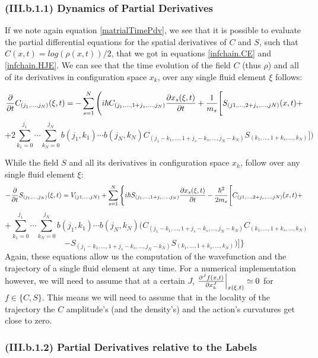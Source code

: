 \documentclass[11pt, a4paper]{article} %
\begin{document}
\subsubsection*{(III.b.1.1) Dynamics of Partial Derivatives}

If we note again equation \eqref{matrialTimePdv}, we see that it is possible to evaluate the partial differential equations for the spatial derivatives of $C$ and $S$, such that $C(x,t)=log(\rho(x,t))/2$, that we got in equations \eqref{infchain.CE} and \eqref{infchain.HJE}. We can see that the time evolution of the field $C$ (thus $\rho$) and all of its derivatives in configuration space $x_k$, over any single fluid element $\xi$ follows:

\begin{equation}\label{infchain.CE.L}
\pdv{}{t}C_{(j_1,...,j_N)}(\xi,t)=-\sum_{s=1}^N \Bigg(i\hbar C_{(j_1,...,1+j_s,...,j_N)}\pdv{x_s(\xi,t)}{t} + \frac{1}{m_s} \Bigg[S_{(j1,...,2+j_s,...,jN)}(x,t)+
\end{equation}
$$
+2 \sum_{k_1=0}^{j_1}\cdots\sum_{k_N=0}^{j_N} b(j_1,k_1)\cdots b(j_N,k_N)C_{(j_1-k_1,...,1+j_s-k_s,...,j_N-k_N)}S_{(k_1,...,1+k_s,...,k_N)} \Bigg]\bigg)
$$

While the field $S$ and all its derivatives in configuration space $x_k$, follow over any single fluid element $\xi$:
\begin{equation}\label{infchain.HJE.L}
-\pdv{}{t}S_{(j_1,...,j_N)}(\xi,t)=V_{(j1,...,jN)}+\sum_{s=1}^N\Bigg\{ i\hbar S_{(j_1,...,1+j_s,...,j_N)}\pdv{x_s(\xi,t)}{t}-\frac{\hbar^2}{2m_s} \Bigg[ C_{(j1,...,2+j_s,...,jN)}(x,t)+
\end{equation}
$$
+\sum_{k_1=0}^{j_1}\cdots\sum_{k_N=0}^{j_N} b(j_1,k_1)\cdots b(j_N,k_N) \Bigg( C_{(j_1-k_1,...,1+j_s-k_s,...,j_N-k_N)}C_{(k_1,...,1+k_s,...,k_N)} 
$$
$$
-S_{(j_1-k_1,...,1+j_s-k_s,...,j_N-k_N)}S_{(k_1,...,1+k_s,...,k_N)}  \Bigg)\Bigg]\Bigg\}
$$
Again, these equations allow us the computation of the wavefunction and the trajectory of a single fluid element at any time. For a numerical implementation however, we will need to assume that at a certain $J$, $\pdv[J]{f(x,t)}{x_k}\Big\rvert_{x(\xi,t)}\simeq 0$ for $f\in\{ C,S\}$. This means we will need to assume that in the locality of the trajectory the $C$ amplitude's (and the density's) and the action's curvatures get close to zero.



\subsubsection*{(III.b.1.2) Partial Derivatives relative to the Labels}
\end{document}
